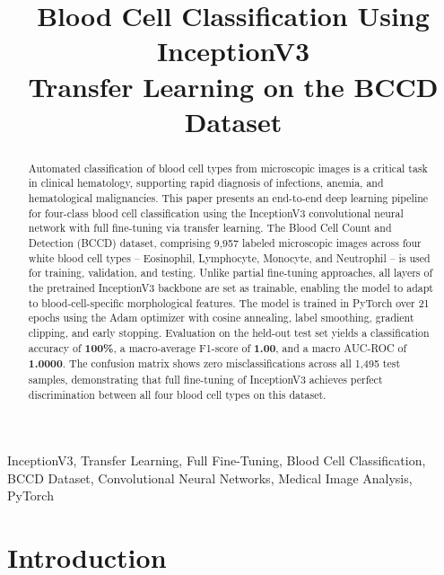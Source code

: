 \documentclass[conference]{IEEEtran}
\begin{document}
\title{Blood Cell Classification Using InceptionV3\\
Transfer Learning on the BCCD Dataset}

\author{
}

\maketitle

\begin{abstract}
Automated classification of blood cell types from microscopic images is a critical task in clinical hematology, supporting rapid diagnosis of infections, anemia, and hematological malignancies. This paper presents an end-to-end deep learning pipeline for four-class blood cell classification using the InceptionV3 convolutional neural network with full fine-tuning via transfer learning. The Blood Cell Count and Detection (BCCD) dataset, comprising 9,957 labeled microscopic images across four white blood cell types -- Eosinophil, Lymphocyte, Monocyte, and Neutrophil -- is used for training, validation, and testing. Unlike partial fine-tuning approaches, all layers of the pretrained InceptionV3 backbone are set as trainable, enabling the model to adapt to blood-cell-specific morphological features. The model is trained in PyTorch over 21 epochs using the Adam optimizer with cosine annealing, label smoothing, gradient clipping, and early stopping. Evaluation on the held-out test set yields a classification accuracy of \textbf{100\%}, a macro-average F1-score of \textbf{1.00}, and a macro AUC-ROC of \textbf{1.0000}. The confusion matrix shows zero misclassifications across all 1,495 test samples, demonstrating that full fine-tuning of InceptionV3 achieves perfect discrimination between all four blood cell types on this dataset.
\end{abstract}

\begin{IEEEkeywords}
InceptionV3, Transfer Learning, Full Fine-Tuning, Blood Cell Classification, BCCD Dataset, Convolutional Neural Networks, Medical Image Analysis, PyTorch
\end{IEEEkeywords}

\section{Introduction}
\end{document}
